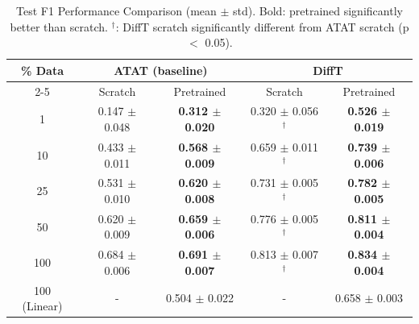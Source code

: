 \begin{table}[h]
\centering
\caption{Test F1 Performance Comparison (mean $\pm$ std). Bold: pretrained significantly better than scratch. $^\dagger$: DiffT scratch significantly different from ATAT scratch (p $<$ 0.05).}
\label{tab:model_comparison}
\begin{tabular}{|c|cc|cc|}
\hline
\multirow{2}{*}{\% Data} & \multicolumn{2}{c|}{ATAT (baseline)} & \multicolumn{2}{c|}{DiffT} \\
\cline{2-5}
 & Scratch & Pretrained & Scratch & Pretrained \\
\hline
1 & 0.147 $\pm$ 0.048 & \textbf{0.312 $\pm$ 0.020} & 0.320 $\pm$ 0.056$^\dagger$ & \textbf{0.526 $\pm$ 0.019} \\
10 & 0.433 $\pm$ 0.011 & \textbf{0.568 $\pm$ 0.009} & 0.659 $\pm$ 0.011$^\dagger$ & \textbf{0.739 $\pm$ 0.006} \\
25 & 0.531 $\pm$ 0.010 & \textbf{0.620 $\pm$ 0.008} & 0.731 $\pm$ 0.005$^\dagger$ & \textbf{0.782 $\pm$ 0.005} \\
50 & 0.620 $\pm$ 0.009 & \textbf{0.659 $\pm$ 0.006} & 0.776 $\pm$ 0.005$^\dagger$ & \textbf{0.811 $\pm$ 0.004} \\
100 & 0.684 $\pm$ 0.006 & \textbf{0.691 $\pm$ 0.007} & 0.813 $\pm$ 0.007$^\dagger$ & \textbf{0.834 $\pm$ 0.004} \\
100 (Linear) & - & 0.504 $\pm$ 0.022 & - & 0.658 $\pm$ 0.003 \\
\hline
\end{tabular}
\end{table}